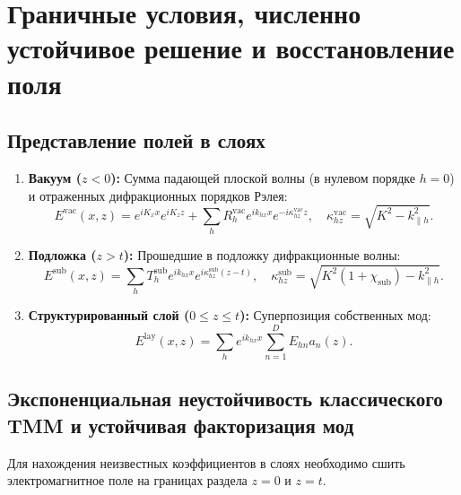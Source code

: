 \documentclass[a4paper,11pt]{article}
\begin{document}
\newpage
\section{Граничные условия, численно устойчивое решение и восстановление поля}

\subsection{Представление полей в слоях}

\begin{enumerate}
    \item \textbf{Вакуум ($z < 0$):} Сумма падающей плоской волны (в нулевом порядке $h = 0$) и отраженных дифракционных порядков Рэлея:
    \begin{equation}
        E^{\text{vac}}(x, z) = e^{i K_x x} e^{i K_z z} + \sum_h R_h^{\text{vac}} e^{i k_{hx} x} e^{-i \kappa_{hz}^{\text{vac}} z}, \quad \kappa_{hz}^{\text{vac}} = \sqrt{K^2 - k_{\parallel h}^2}.
        \label{eq:field_vac}
    \end{equation}
    \item \textbf{Подложка ($z > t$):} Прошедшие в подложку дифракционные волны:
    \begin{equation}
        E^{\text{sub}}(x, z) = \sum_h T_h^{\text{sub}} e^{i k_{hx} x} e^{i \kappa_{hz}^{\text{sub}} (z - t)}, \quad \kappa_{hz}^{\text{sub}} = \sqrt{K^2(1 + \chi_{\text{sub}}) - k_{\parallel h}^2}.
        \label{eq:field_sub}
    \end{equation}
    \item \textbf{Структурированный слой ($0 \le z \le t$):} Суперпозиция собственных мод:
    \begin{equation}
        E^{\text{lay}}(x, z) = \sum_h e^{i k_{hx} x} \sum_{n=1}^D E_{hn} a_n(z).
        \label{eq:field_lay}
    \end{equation}
\end{enumerate}

\subsection{Экспоненциальная неустойчивость классического TMM и устойчивая факторизация мод}

Для нахождения неизвестных коэффициентов в слоях необходимо сшить электромагнитное поле на границах раздела $z = 0$ и $z = t$.
\end{document}
